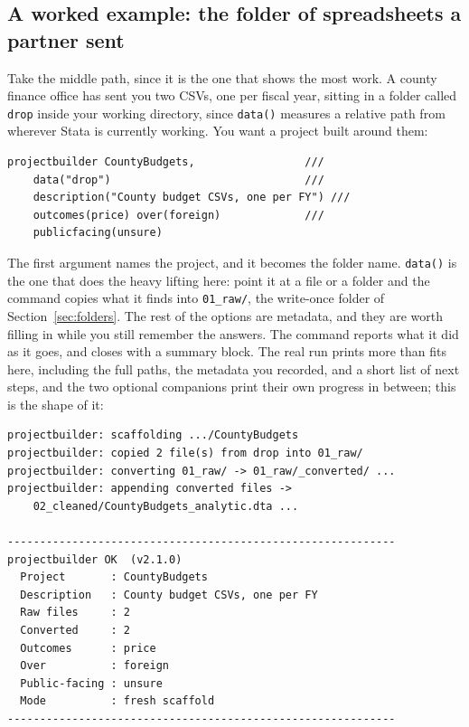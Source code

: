 \documentclass[
    a4paper,
    fontsize=10pt,
    twoside=true,
    numbers=noenddot,
]{kaobook}
\begin{document}
\subsection{A worked example: the folder of spreadsheets a partner sent}\label{sec:ch02-pb-worked}
Take the middle path, since it is the one that shows the most work. A county finance office has sent you two CSVs, one per fiscal year, sitting in a folder called \texttt{drop} inside your working directory, since \texttt{data()} measures a relative path from wherever Stata is currently working. You want a project built around them:
\par
{\footnotesize
\begin{verbatim}
projectbuilder CountyBudgets,                 ///
    data("drop")                              ///
    description("County budget CSVs, one per FY") ///
    outcomes(price) over(foreign)             ///
    publicfacing(unsure)
\end{verbatim}
}
The first argument names the project, and it becomes the folder name. \texttt{data()} is the one that does the heavy lifting here: point it at a file or a folder and the command copies what it finds into \texttt{01\_raw/}, the write-once folder of Section~\ref{sec:folders}. The rest of the options are metadata, and they are worth filling in while you still remember the answers. The command reports what it did as it goes, and closes with a summary block. The real run prints more than fits here, including the full paths, the metadata you recorded, and a short list of next steps, and the two optional companions print their own progress in between; this is the shape of it:
\par
{\footnotesize
\begin{verbatim}
projectbuilder: scaffolding .../CountyBudgets
projectbuilder: copied 2 file(s) from drop into 01_raw/
projectbuilder: converting 01_raw/ -> 01_raw/_converted/ ...
projectbuilder: appending converted files ->
    02_cleaned/CountyBudgets_analytic.dta ...

------------------------------------------------------------
projectbuilder OK  (v2.1.0)
  Project       : CountyBudgets
  Description   : County budget CSVs, one per FY
  Raw files     : 2
  Converted     : 2
  Outcomes      : price
  Over          : foreign
  Public-facing : unsure
  Mode          : fresh scaffold
------------------------------------------------------------
\end{verbatim}
}
\end{document}
